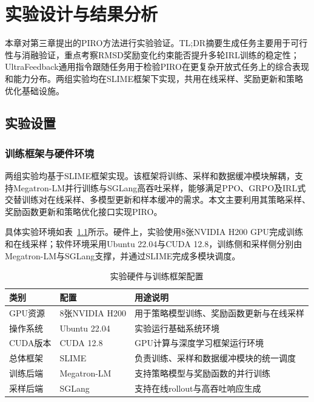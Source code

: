 
\chapter{实验设计与结果分析}

本章对第三章提出的PIRO方法进行实验验证。TL;DR摘要生成任务主要用于可行性与消融验证，重点考察RMSD奖励变化约束能否提升多轮IRL训练的稳定性；UltraFeedback通用指令跟随任务用于检验PIRO在更复杂开放式任务上的综合表现和能力分布。两组实验均在SLIME框架下实现，共用在线采样、奖励更新和策略优化基础设施。

\section{实验设置}

\subsection{训练框架与硬件环境}

两组实验均基于SLIME框架实现。该框架将训练、采样和数据缓冲模块解耦，支持Megatron-LM\cite{shoeybi2019megatronlm}并行训练与SGLang\cite{zheng2023sglang}高吞吐采样，能够满足PPO、GRPO及IRL式交替训练对在线采样、多模型更新和样本缓冲的需求。本文主要利用其策略采样、奖励函数更新和策略优化接口实现PIRO。

具体实验环境如表~\ref{tab:env_config}所示。硬件上，实验使用8张NVIDIA H200 GPU完成训练和在线采样；软件环境采用Ubuntu 22.04与CUDA 12.8，训练侧和采样侧分别由Megatron-LM与SGLang支撑，并通过SLIME完成多模块调度。

\begin{table}[htbp]
    \centering
    \caption{实验硬件与训练框架配置}
    \label{tab:env_config}
    \small
    \renewcommand{\arraystretch}{1.2}
    \begin{tabular}{p{}p{}p{}}
        \toprule
        \textbf{类别} & \textbf{配置} & \textbf{用途说明} \\
        \midrule
        GPU资源 & 8张NVIDIA H200 & 用于策略模型训练、奖励函数更新与在线采样 \\
        操作系统 & Ubuntu 22.04 & 实验运行基础系统环境 \\
        CUDA版本 & CUDA 12.8 & GPU计算与深度学习框架运行环境 \\
        总体框架 & SLIME & 负责训练、采样和数据缓冲模块的统一调度 \\
        训练后端 & Megatron-LM & 支持策略模型与奖励函数的并行训练 \\
        采样后端 & SGLang & 支持在线rollout与高吞吐响应生成 \\
        \bottomrule
    \end{tabular}
\end{table}

